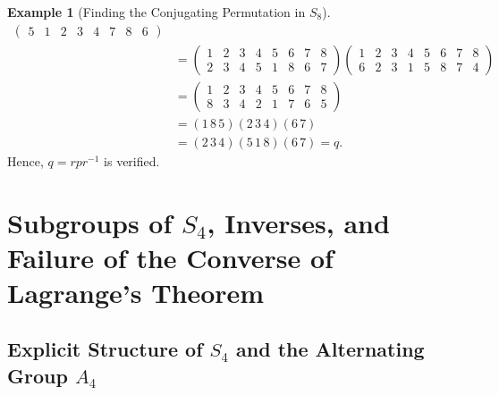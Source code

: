 \documentclass[12pt]{article}
\theoremstyle{definition}
\newtheorem{example}[definition]{Example}
\theoremstyle{plain}
\begin{document}
\begin{example}[Finding the Conjugating Permutation in $S_8$]
\begin{align*}
\begin{pmatrix}
5 & 1 & 2 & 3 & 4 & 7 & 8 & 6
\end{pmatrix} \\
&= \begin{pmatrix}
1 & 2 & 3 & 4 & 5 & 6 & 7 & 8 \\
2 & 3 & 4 & 5 & 1 & 8 & 6 & 7
\end{pmatrix}
\begin{pmatrix}
1 & 2 & 3 & 4 & 5 & 6 & 7 & 8 \\
6 & 2 & 3 & 1 & 5 & 8 & 7 & 4
\end{pmatrix} \\
&= \begin{pmatrix}
1 & 2 & 3 & 4 & 5 & 6 & 7 & 8 \\
8 & 3 & 4 & 2 & 1 & 7 & 6 & 5
\end{pmatrix} \\
&= (1\,8\,5)(2\,3\,4)(6\,7) \\
&= (2\,3\,4)(5\,1\,8)(6\,7) = q.
\end{align*}
Hence, $q = r p r^{-1}$ is verified.
\end{example}

\newpage
\section{Subgroups of \texorpdfstring{$S_4$}{S4}, Inverses, and Failure of the Converse of Lagrange's Theorem}

\subsection{Explicit Structure of \texorpdfstring{$S_4$}{S4} and the Alternating Group \texorpdfstring{$A_4$}{A4}}
\end{document}
